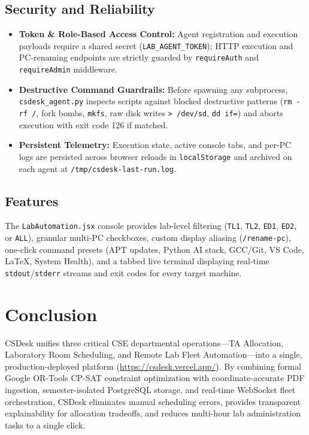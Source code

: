 \documentclass[12pt,a4paper]{article}
\begin{document}
\subsection{Security and Reliability}
\begin{itemize}[leftmargin=*]
    \item \textbf{Token \& Role-Based Access Control:} Agent registration and execution payloads require a shared secret (\texttt{LAB\_AGENT\_TOKEN}); HTTP execution and PC-renaming endpoints are strictly guarded by \texttt{requireAuth} and \texttt{requireAdmin} middleware.
    \item \textbf{Destructive Command Guardrails:} Before spawning any subprocess, \texttt{csdesk\_agent.py} inspects scripts against blocked destructive patterns (\texttt{rm -rf /}, fork bombs, \texttt{mkfs}, raw disk writes \texttt{> /dev/sd}, \texttt{dd if=}) and aborts execution with exit code 126 if matched.
    \item \textbf{Persistent Telemetry:} Execution state, active console tabs, and per-PC logs are persisted across browser reloads in \texttt{localStorage} and archived on each agent at \texttt{/tmp/csdesk-last-run.log}.
\end{itemize}

\subsection{Features}
The \texttt{LabAutomation.jsx} console provides lab-level filtering (\texttt{TL1}, \texttt{TL2}, \texttt{ED1}, \texttt{ED2}, or \texttt{ALL}), granular multi-PC checkboxes, custom display aliasing (\texttt{/rename-pc}), one-click command presets (APT updates, Python AI stack, GCC/Git, VS Code, LaTeX, System Health), and a tabbed live terminal displaying real-time \texttt{stdout}/\texttt{stderr} streams and exit codes for every target machine.

\section{Conclusion}
CSDesk unifies three critical CSE departmental operations—TA Allocation, Laboratory Room Scheduling, and Remote Lab Fleet Automation—into a single, production-deployed platform (\url{https://csdesk.vercel.app/}). By combining formal Google OR-Tools CP-SAT constraint optimization with coordinate-accurate PDF ingestion, semester-isolated PostgreSQL storage, and real-time WebSocket fleet orchestration, CSDesk eliminates manual scheduling errors, provides transparent explainability for allocation tradeoffs, and reduces multi-hour lab administration tasks to a single click.
\end{document}

